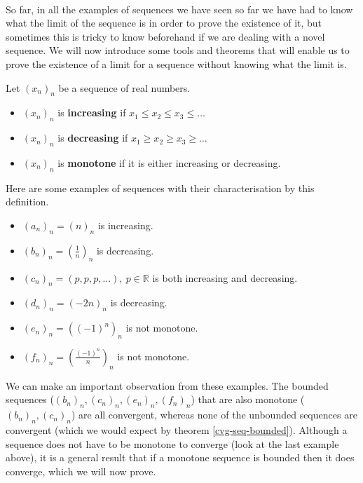 \documentclass[../real_analysis.tex]{subfiles}
\begin{document}
        \paragraph{}
        So far, in all the examples of sequences we have seen so far we have had to know what the limit of the sequence is in order to prove the existence of it, but sometimes this is tricky to know beforehand if we are dealing with a novel sequence. We will now introduce some tools and theorems that will enable us to prove the existence of a limit for a sequence without knowing what the limit is.
        \begin{definition}
            Let $(x_n)_n$ be a sequence of real numbers.
            \begin{itemize}
                \item $(x_n)_n$ is \textbf{increasing} if $x_1\leq x_2\leq x_3\leq\dots$
                \item $(x_n)_n$ is \textbf{decreasing} if $x_1\geq x_2\geq x_3\geq\dots$
                \item $(x_n)_n$ is \textbf{monotone} if it is either increasing or decreasing.
            \end{itemize}
        \end{definition}
        \begin{example}
            Here are some examples of sequences with their characterisation by this definition.
            \begin{itemize}
                \item $(a_n)_n=(n)_n$ is increasing.
                \item $(b_n)_n=\left(\frac{1}{n}\right)_n$ is decreasing.
                \item $(c_n)_n=(p, p, p,\dots),\ p\in\mathbb{R}$ is both increasing and decreasing.
                \item $(d_n)_n=(-2n)_n$ is decreasing.
                \item $(e_n)_n=((-1)^n)_n$ is not monotone.
                \item $(f_n)_n=\left(\frac{(-1)^n}{n}\right)_n$ is not monotone.
            \end{itemize}
        \end{example}
        We can make an important observation from these examples. The bounded sequences ($(b_n)_n, (c_n)_n, (e_n)_n, (f_n)_n$) that are also monotone ($(b_n)_n, (c_n)_n$) are all convergent, whereas none of the unbounded sequences are convergent (which we would expect by theorem \ref{cvg-seq-bounded}). Although a sequence does not have to be monotone to converge (look at the last example above), it is a general result that if a monotone sequence is bounded then it does converge, which we will now prove.
\end{document}
